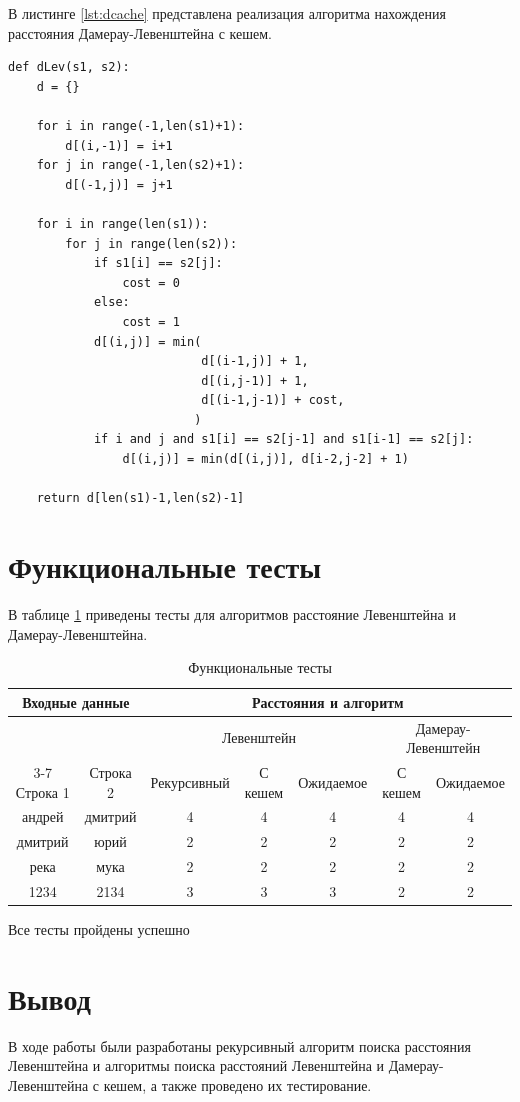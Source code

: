 \clearpage

В листинге \ref{lst:dcache} представлена реализация алгоритма нахождения расстояния Дамерау-Левенштейна с кешем.

\begin{lstlisting}[label=lst:dcache,caption={Итерационный алгоритм нахождения расстояния Дамерау-Левенштейна с кешэм}]
def dLev(s1, s2):
    d = {}
    
    for i in range(-1,len(s1)+1):
        d[(i,-1)] = i+1
    for j in range(-1,len(s2)+1):
        d[(-1,j)] = j+1
 
    for i in range(len(s1)):
        for j in range(len(s2)):
            if s1[i] == s2[j]:
                cost = 0
            else:
                cost = 1
            d[(i,j)] = min(
                           d[(i-1,j)] + 1,
                           d[(i,j-1)] + 1,
                           d[(i-1,j-1)] + cost,
                          )
            if i and j and s1[i] == s2[j-1] and s1[i-1] == s2[j]:
                d[(i,j)] = min(d[(i,j)], d[i-2,j-2] + 1)
 
    return d[len(s1)-1,len(s2)-1]
\end{lstlisting}

\section{Функциональные тесты}

В таблице \ref{tbl:func_tests} приведены тесты для алгоритмов расстояние Левенштейна и Дамерау-Левенштейна.

\begin{table}[H]
	\small
	\begin{center}
		\begin{threeparttable}
			\caption{Функциональные тесты}
			\label{tbl:func_tests}
			\begin{tabular}{|c|c|c|c|c|c|c|}
				\hline
				\multicolumn{2}{|c|}{\bfseries Входные данные}
				& \multicolumn{5}{c|}{\bfseries Расстояния и алгоритм} \\ 
				\hline
				&
				&
				\multicolumn{3}{c|}{Левенштейн} & \multicolumn{2}{c|}{Дамерау-Левенштейн} \\ \cline{3-7}
				Строка 1 & Строка 2 & Рекурсивный & С кешем &  Ожидаемое & С кешем & Ожидаемое \\
				\hline
				андрей & дмитрий & 4 & 4 & 4 & 4 & 4 \\
				\hline
				дмитрий & юрий & 2 & 2 & 2 & 2 & 2 \\
				\hline
				река & мука & 2 & 2 & 2 & 2 & 2 \\
				\hline
				1234 & 2134 & 3 & 3 & 3 & 2 & 2 \\
				\hline
			\end{tabular}	
		\end{threeparttable}
	\end{center}
\end{table}

Все тесты пройдены успешно

\section*{Вывод}

В ходе работы были разработаны рекурсивный алгоритм поиска расстояния Левенштейна и алгоритмы поиска расстояний Левенштейна и Дамерау-Левенштейна с кешем, а также проведено их тестирование.

\clearpage
